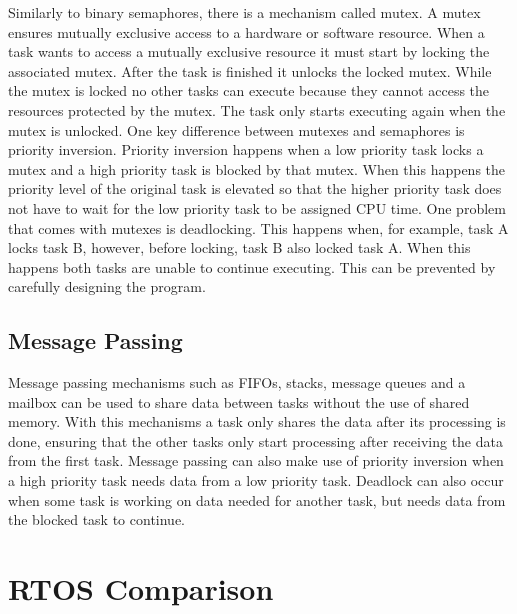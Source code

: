 Similarly to binary semaphores, there is a mechanism called mutex. A mutex ensures mutually exclusive access to a hardware or software resource. When a task wants to access a mutually exclusive resource it must start by locking the associated mutex. After the task is finished it unlocks the locked mutex. While the mutex is locked no other tasks can execute because they cannot access the resources protected by the mutex. The task only starts executing again when the mutex is unlocked. One key difference between mutexes and semaphores is priority inversion. Priority inversion happens when a low priority task locks a mutex and a high priority task is blocked by that mutex. When this happens the priority level of the original task is elevated so that the higher priority task does not have to wait for the low priority task to be assigned CPU time. One problem that comes with mutexes is deadlocking. This happens when, for example, task A locks task B, however, before locking, task B also locked task A. When this happens both tasks are unable to continue executing. This can be prevented by carefully designing the program.

\subsection{Message Passing}
Message passing mechanisms such as FIFOs, stacks, message queues and a mailbox can be used to share data between tasks without the use of shared memory. With this mechanisms a task only shares the data after its processing is done, ensuring that the other tasks only start processing after receiving the data from the first task. Message passing can also make use of priority inversion when a high priority task needs data from a low priority task. Deadlock can also occur when some task is working on data needed for another task, but needs data from the blocked task to continue.


\section{RTOS Comparison}

